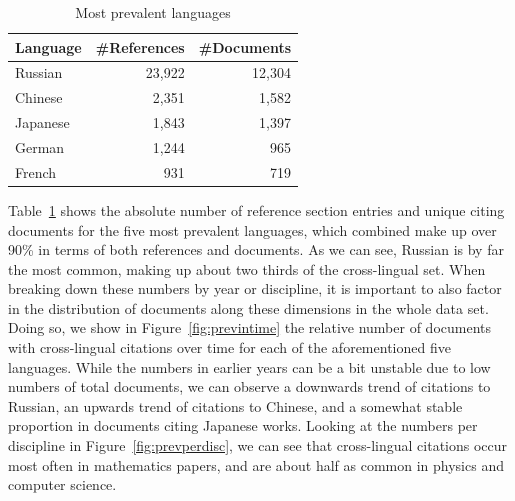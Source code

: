 \begin{table}
\caption{Most prevalent languages}
 \label{tab:prevlangs}
  \centering
  \begin{small}
 \begin{threeparttable}
 \begin{tabular}{lrr}
 \toprule
   Language & \#References & \#Documents \\
   \midrule
   Russian & 23,922 & 12,304 \\
   Chinese & 2,351 & 1,582 \\
   Japanese & 1,843 & 1,397 \\
   German & 1,244 & 965 \\
   French & 931 & 719 \\
   \bottomrule
 \end{tabular}
\end{threeparttable}
  \end{small}
\end{table}

Table~\ref{tab:prevlangs} shows the absolute number of reference section entries and unique citing documents for the five most prevalent languages, which combined make up over 90\% in terms of both references and documents. As we can see, Russian is by far the most common, making up about two thirds of the cross-lingual set. When breaking down these numbers by year or discipline, it is important to also factor in the distribution of documents along these dimensions in the whole data set. Doing so, we show in Figure~\ref{fig:previntime} the relative number of documents with cross-lingual citations over time for each of the aforementioned five languages. While the numbers in earlier years can be a bit unstable due to low numbers of total documents, we can observe a downwards trend of citations to Russian, an upwards trend of citations to Chinese, and a somewhat stable proportion in documents citing Japanese works. Looking at the numbers per discipline in Figure~\ref{fig:prevperdisc}, we can see that cross-lingual citations occur most often in mathematics papers, and are about half as common in physics and computer science.

